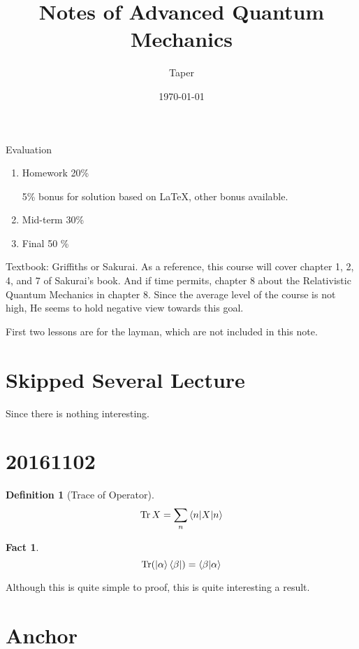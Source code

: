 \documentclass{article}
\title{Notes of Advanced Quantum Mechanics}
\date{\today}
\author{Taper}
\numberwithin{equation}{subsection} %
\newtheorem{defi}{Definition}[section]
\theoremstyle{definition}
\newtheorem{fact}{Fact}[section]
\begin{document}
\maketitle
{}
\tableofcontents

Evaluation
\begin{enumerate}
    \item Homework 20\%

        5\% bonus for solution based on \LaTeX, other bonus available.
    \item Mid-term 30\%
    \item Final 50 \%
\end{enumerate}

Textbook: Griffiths or Sakurai. As a reference, this course will cover
chapter 1, 2, 4, and 7 of Sakurai's book. And if time permits, chapter 8
about the Relativistic Quantum Mechanics in chapter 8. Since the average
level of the course is not high, He seems to hold negative view towards
this goal.

First two lessons are for the layman, which are not included in
this note.

\section{Skipped Several Lecture}
\label{sec:Skipped-Several-Lecture}
Since there is nothing interesting.

\section{20161102}
\label{sec:20161102}
\begin{defi}[Trace of Operator]
\begin{equation}
    \operatorname{Tr} X = \sum_n \braket{n |X| n}
\end{equation}
\end{defi}
\begin{fact}
    \begin{equation}
        \operatorname{Tr}(\ket{\alpha}\bra{\beta}) =
        \braket{\beta|\alpha}
    \end{equation}
\end{fact}
Although this is quite simple to proof, this is quite interesting a
result.
\section{Anchor}
\label{sec:Anchor}
\end{document}
